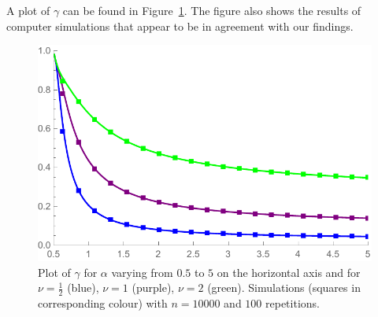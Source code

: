 \begin{theorem}
\end{theorem}

\noindent
A plot of $\gamma$ can be found in Figure~\ref{fig:gamma}. The figure also shows the results of computer simulations that appear to be in agreement with our findings.


\begin{figure}[h!]
    \centering
    \includegraphics[scale=0.6]{figures/cn10000nu0512rep100a05to5Squares.pdf}
    \caption{Plot of $\gamma$ for $\alpha$ varying from $0.5$ to $5$ on the horizontal axis and 
    for $\nu=\frac{1}{2}$ (blue), $\nu=1$ (purple), $\nu=2$ (green). Simulations (squares in corresponding colour) with $n=10000$ and $100$ repetitions.\label{fig:gamma}}
\end{figure}

